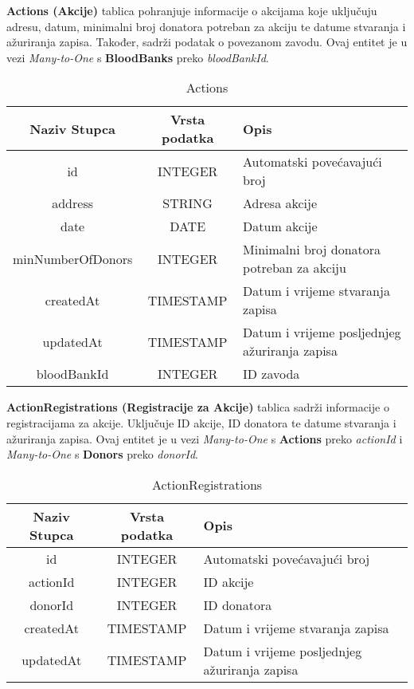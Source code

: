				\noindent\textbf{Actions (Akcije)} tablica pohranjuje informacije o akcijama koje uključuju adresu, datum, minimalni broj donatora potreban za akciju te datume stvaranja i ažuriranja zapisa. Također, sadrži podatak o povezanom zavodu. Ovaj entitet je u vezi \textit{Many-to-One} s \textbf{BloodBanks} preko \textit{bloodBankId}.
				\begin{table}[H]
				    \renewcommand{\arraystretch}{2}
				    \centering
				     \begin{tabularx}{1\textwidth}{|c|c|X|}
				    \hline
				    \textbf{Naziv Stupca} & \textbf{Vrsta podatka} & \textbf{Opis} \\
				    \hline
				    \cellcolor{LightGreen}id & INTEGER & Automatski povećavajući broj\\
				    \hline
				    address & STRING & Adresa akcije \\
				    \hline
				    date & DATE & Datum akcije \\
				    \hline
				    minNumberOfDonors & INTEGER & Minimalni broj donatora potreban za akciju \\
				    \hline
				    createdAt & TIMESTAMP & Datum i vrijeme stvaranja zapisa \\
				    \hline
				    updatedAt & TIMESTAMP & Datum i vrijeme posljednjeg ažuriranja zapisa \\
				    \hline
				    \cellcolor{LightBlue} bloodBankId & INTEGER & ID zavoda \\
				    \hline
				    \end{tabularx}
				    \caption{Actions}
				    \label{tab:my_label}
				\end{table}
				\clearpage %
				
				\noindent\textbf{ActionRegistrations (Registracije za Akcije)} tablica sadrži informacije o registracijama za akcije. Uključuje ID akcije, ID donatora te datume stvaranja i ažuriranja zapisa. Ovaj entitet je u vezi \textit{Many-to-One} s \textbf{Actions} preko \textit{actionId} i \textit{Many-to-One} s \textbf{Donors} preko \textit{donorId}.
				\begin{table}[H]
				    \renewcommand{\arraystretch}{2}
				    \centering
				     \begin{tabularx}{1\textwidth}{|c|c|X|}
				    \hline
				    \textbf{Naziv Stupca} & \textbf{Vrsta podatka} & \textbf{Opis} \\
				    \hline
				    \cellcolor{LightGreen} id & INTEGER & Automatski povećavajući broj\\
				    \hline
				    \cellcolor{LightBlue} actionId & INTEGER & ID akcije  \\
				    \hline
				    \cellcolor{LightGreen}donorId & INTEGER & ID donatora \\
				    \hline
				    createdAt & TIMESTAMP & Datum i vrijeme stvaranja zapisa \\
				    \hline
				    updatedAt & TIMESTAMP & Datum i vrijeme posljednjeg ažuriranja zapisa \\
				    \hline
				    \end{tabularx}
				    \caption{ActionRegistrations}
				    \label{tab:my_label}
				\end{table}
				\clearpage %

